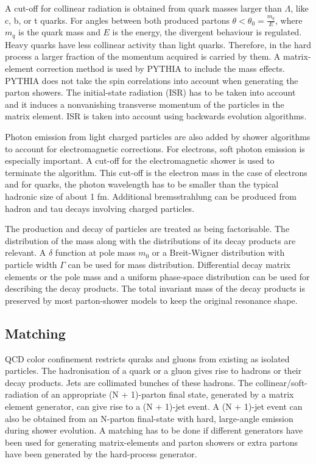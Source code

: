 A cut-off for collinear radiation is obtained from quark masses larger than $\Lambda$, like c, b, or t quarks. For angles between both produced partons $\theta < \theta_{0} = \frac{m_q}{E}$, where $m_q$ is the quark mass and $E$ is the energy, the divergent behaviour is regulated. Heavy quarks have less collinear activity than light quarks. Therefore, in the hard process a larger fraction of the momentum acquired is carried by them. A matrix-element correction method is used by PYTHIA to include the mass effects. PYTHIA does not take the spin correlations into account when generating the parton showers. The initial-state radiation (ISR) has to be taken into account and it induces a nonvanishing transverse momentum of the particles in the matrix element. ISR is taken into account using backwards evolution algorithms.

Photon emission from light charged particles are also added by shower algorithms to account for electromagnetic corrections. For electrons, soft photon emission is especially important. A cut-off for the electromagnetic shower is used to terminate the algorithm. This cut-off is the electron mass in the case of electrons and for quarks, the photon wavelength has to be smaller than the typical hadronic size of about 1 fm. Additional bremsstrahlung can be produced from hadron and tau decays involving charged particles.

The production and decay of particles are treated as being factorisable. The distribution of the mass along with the distributions of its decay products are relevant. A $\delta$ function at pole mass $m_0$ or a Breit-Wigner distribution with particle width $\Gamma$ can be used for mass distribution. Differential decay matrix elements or the pole mass and a uniform phase-space distribution can be used for describing the decay products. The total invariant mass of the decay products is preserved by most parton-shower models to keep the original resonance shape.

\subsection{Matching}

QCD color confinement restricts quraks and gluons from existing as isolated particles. The hadronisation of a quark or a gluon gives rise to hadrons or their decay products. Jets are collimated bunches of these hadrons. The collinear/soft-radiation of an appropriate (N + 1)-parton final state, generated by a matrix element generator, can give rise to a (N + 1)-jet event. A (N + 1)-jet event can also be obtained from an N-parton final-state with hard, large-angle emission during shower evolution. A matching has to be done if different generators have been used for generating matrix-elements and parton showers or extra partons have been generated by the hard-process generator.

